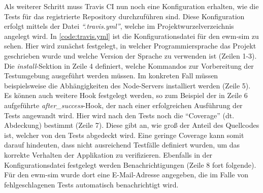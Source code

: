 Als weiterer Schritt muss Travis CI nun noch eine Konfiguration erhalten, wie die Tests für das registrierte Repository durchzuführen sind.
Diese Konfiguration erfolgt mittels der Datei \emph{\enquote{.travis.yml}}, welche im Projektwurzelverzeichnis angelegt wird.
In \autoref{code:travis.yml} ist die Konfigurationsdatei für den \ac{ewm-sim} zu sehen.
Hier wird zunächst festgelegt, in welcher Programmiersprache das Projekt geschrieben wurde und welche Version der Sprache zu verwenden ist (Zeilen 1-3).
Die \emph{install}-Sektion in Zeile 4 definiert, welche Kommandos zur Vorbereitung der Testumgebung ausgeführt werden müssen.
Im konkreten Fall müssen beispielsweise die Abhängigkeiten des Node-Servers installiert werden (Zeile 5).
Es können auch weitere Hook festgelegt werden, so zum Beispiel der in Zeile 6 aufgeführte \emph{after\_success}-Hook, der nach einer erfolgreichen Ausführung der Tests angewandt wird.
Hier wird nach den Tests noch die \enquote{Coverage} (dt. Abdeckung) bestimmt (Zeile 7).
Diese gibt an, wie groß der Anteil des Quellcodes ist, welcher von den Tests abgedeckt wird.
Eine geringe Coverage kann somit darauf hindeuten, dass nicht ausreichend Testfälle definiert wurden, um das korrekte Verhalten der Applikation zu verifizieren.
Ebenfalls in der Konfigurationsdatei festgelegt werden Benachrichtigungen (Zeile 8 fort folgende).
Für den \ac{ewm-sim} wurde dort eine E-Mail-Adresse angegeben, die im Falle von fehlgeschlagenen Tests automatisch benachrichtigt wird.




